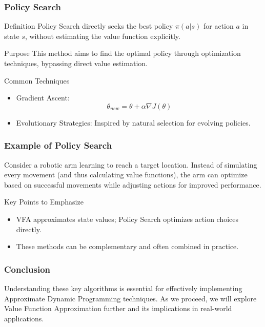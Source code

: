 \documentclass[aspectratio=169]{beamer}
\begin{document}
\begin{frame}[fragile]
    \frametitle{Policy Search}
    \begin{block}{Definition}
        Policy Search directly seeks the best policy \( \pi(a | s) \) for action \( a \) in state \( s \), without estimating the value function explicitly.
    \end{block}
    
    \begin{block}{Purpose}
        This method aims to find the optimal policy through optimization techniques, bypassing direct value estimation.
    \end{block}

    \begin{block}{Common Techniques}
        \begin{itemize}
            \item Gradient Ascent: 
            \[
            \theta_{new} = \theta + \alpha \nabla J(\theta)
            \]
            \item Evolutionary Strategies: Inspired by natural selection for evolving policies.
        \end{itemize}
    \end{block}
\end{frame}

\begin{frame}[fragile]
    \frametitle{Example of Policy Search}
    Consider a robotic arm learning to reach a target location. Instead of simulating every movement (and thus calculating value functions), the arm can optimize based on successful movements while adjusting actions for improved performance.

    \begin{block}{Key Points to Emphasize}
        \begin{itemize}
            \item VFA approximates state values; Policy Search optimizes action choices directly.
            \item These methods can be complementary and often combined in practice.
        \end{itemize}
    \end{block}
\end{frame}

\begin{frame}[fragile]
    \frametitle{Conclusion}
    Understanding these key algorithms is essential for effectively implementing Approximate Dynamic Programming techniques. 
    As we proceed, we will explore Value Function Approximation further and its implications in real-world applications.
\end{frame}
\end{document}
